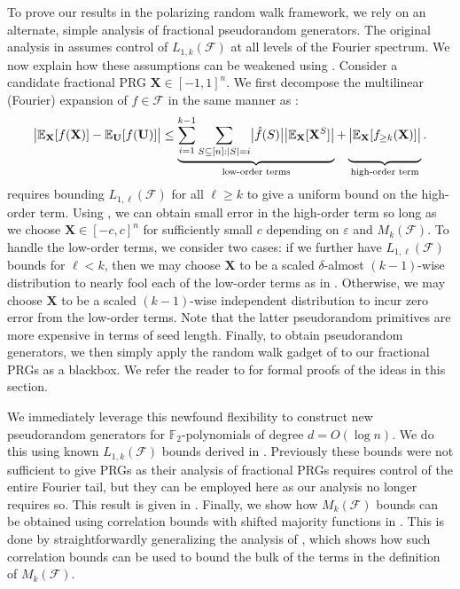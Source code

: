 \documentclass[10pt,a4paper]{article}
\newcommand{\eps}{\varepsilon}
\theoremstyle{definition}
\begin{document}
To prove our results {in the polarizing random walk framework}, we rely on an alternate, simple analysis of fractional pseudorandom generators.
%
{The original analysis in \cite{CHHL} assumes control of $L_{1,k}(\mathcal{F})$ at all levels of the Fourier spectrum.
We now explain how these assumptions can be weakened using .
Consider a candidate fractional PRG $\mathbf{X}\in [-1,1]^n$.} 
%
We first decompose the multilinear (Fourier) expansion of $f\in \mathcal{F}$
in the same manner as \cite{CHHL}:
%
\begin{equation}
   \bigl| \mathbb{E}_{\mathbf{X}}[f(\mathbf{X})]-\mathbb{E}_{\mathbf{U}}[f(\mathbf{U})] \bigr|
   \leq  \underbrace{\sum_{i=1}^{k-1}\sum_{S\subseteq [n]:\vert S\vert = i} \bigl| \hat{f}(S) \bigr|
   \bigl| \mathbb{E}_{\mathbf{X}}[\mathbf{X}^S] \bigr|}_{\text{low-order terms}} + 
   \underbrace{\vphantom{\sum_{S\subseteq[n}} \bigl| \mathbb{E}_{\mathbf{X}}[f_{\geq k}(\mathbf{X})] \bigr| }_{\text{high-order term}}.
\end{equation}
{\cite{CHHL} requires bounding $L_{1,\ell}(\mathcal{F})$ for all $\ell \ge k$ to give a uniform bound on the high-order term.  
%
Using , we can obtain small error in the high-order term so long as we choose $\mathbf{X}\in [-c,c]^n$ for sufficiently small $c$ depending on $\eps$ and $M_k(\mathcal{F})$. 
%
To handle the low-order terms, we consider two cases: if we further have $L_{1,\ell}(\mathcal{F})$ bounds for $\ell<k$, then we may choose $\mathbf{X}$ to be a scaled $\delta$-almost $(k-1)$-wise distribution to nearly fool each of the low-order terms as in \cite{CHHL}. Otherwise, we may choose $\mathbf{X}$ to be a scaled $(k-1)$-wise independent distribution to incur zero error from the low-order terms. Note that the latter pseudorandom primitives are more expensive in terms of seed length.} Finally, to obtain pseudorandom generators, we then simply apply the random walk gadget of \cite{CHHL} to our fractional PRGs as a blackbox.  We refer the reader to  for formal proofs of the ideas in this section.

{We immediately leverage this newfound flexibility to construct new pseudorandom generators for $\mathbb{F}_2$-polynomials of degree $d = O(\log n)$.
%
We do this using known $L_{1,k}(\mathcal{F})$ bounds derived in \cite{CHHL}.
Previously these bounds were not sufficient to give PRGs as their analysis of fractional PRGs requires control of the entire Fourier tail,
%
but they can be employed here as our analysis no longer requires so. This result is given in . Finally, we show how $M_k(\mathcal{F})$ bounds can be obtained using correlation bounds with shifted majority functions in . This is done by straightforwardly generalizing the analysis of \cite{xorlemma}, which shows how such correlation bounds can be used to bound the bulk of the terms in the definition of $M_k(\mathcal{F})$.}
\end{document}
